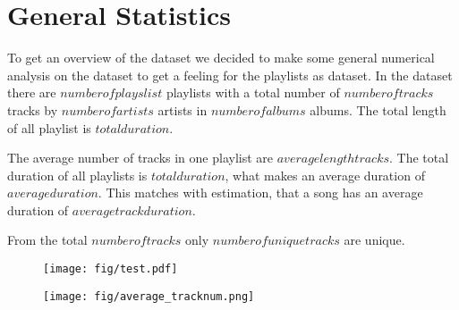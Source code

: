 \section{General Statistics}
To get an overview of the dataset we decided to make some general numerical analysis on the dataset to get a feeling for the playlists as dataset. In the dataset there are $number of playslist$ playlists with a total number of $number of tracks$ tracks by $number of artists$ artists in $number of albums$ albums. The total length of all playlist is $total duration$.

The average number of tracks in one playlist are $average length tracks$. The total duration of all playlists is $total duration$, what makes an average duration of $average duration$. This matches with estimation, that a song has an average duration of $average track duration$.


From the total $number of tracks$ only $number of unique tracks$ are unique.



\begin{figure}[H]
    \centering
    \texttt{[image: fig/test.pdf]}
    \caption{}
\end{figure}
    
\begin{figure}[H]
    \centering
    \texttt{[image: fig/average\_tracknum.png]}
    \caption{}
\end{figure}